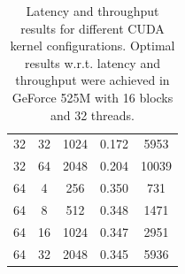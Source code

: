 \documentclass[11pt,twocolumn]{IEEEtran}
\begin{document}
\begin{table}
\begin{tabular}{ l | c | c| | c | c  }
  \\
32 & 32 & 1024
 & 0.172

 & 5953

  \\
32 & 64 & 2048
 &0.204

 & 10039


  \\

 \hline

64 & 4 & 256
 & 0.350

 & 731
  \\
64 & 8 & 512
 &0.348

 & 1471

  \\
64 & 16 & 1024
 & 0.347

 & 2951

  \\
64 & 32 & 2048
 & 0.345

 & 5936
  \\

 \hline
  \end{tabular}

\caption{\footnotesize{Latency and throughput results for different CUDA kernel configurations. Optimal results w.r.t. latency and throughput were achieved in GeForce 525M with 16 blocks and 32 threads.}}
\label{tab:spectable1}

\end{table}



\twocolumn



\end{document}
